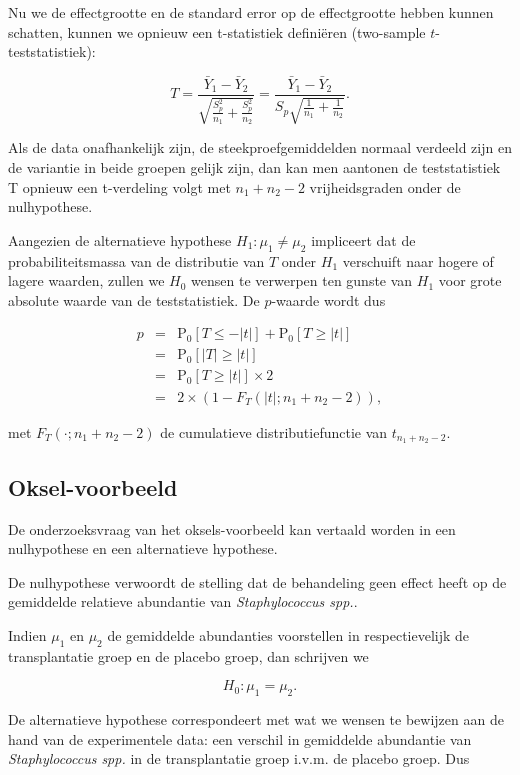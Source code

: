 \documentclass[
  12pt,dutch]{book}
\theoremstyle{definition}
\theoremstyle{definition}
\theoremstyle{definition}
\theoremstyle{definition}
\theoremstyle{remark}
\begin{document}
Nu we de effectgrootte en de standard error op de effectgrootte hebben kunnen schatten, kunnen we opnieuw een t-statistiek definiëren (two-sample \(t\)-teststatistiek):

\[T = \frac{\bar{Y}_1-\bar{Y}_2}{\sqrt{\frac{S_p^2}{n_1}+\frac{S_p^2}{n_2}}} =
  \frac{\bar{Y}_1 - \bar{Y}_2}{S_p\sqrt{\frac{1}{n_1}+\frac{1}{n_2}}}.\]

Als de data onafhankelijk zijn, de steekproefgemiddelden normaal verdeeld zijn en de variantie in beide groepen gelijk zijn, dan kan men aantonen de teststatistiek T opnieuw een t-verdeling volgt met \(n_1+n_2-2\) vrijheidsgraden onder de nulhypothese.

Aangezien de alternatieve hypothese \(H_1: \mu_1 \neq \mu_2\) impliceert dat de probabiliteitsmassa van de distributie van \(T\) onder \(H_1\) verschuift naar hogere of lagere waarden, zullen we \(H_0\) wensen te verwerpen ten gunste van \(H_1\) voor grote absolute waarde van de teststatistiek. De \(p\)-waarde wordt dus

\begin{eqnarray*}
  p&=&\text{P}_0\left[T\leq -|t|\right] + \text{P}_0\left[T\geq |t|\right]\\
  &=&\text{P}_0\left[\vert T\vert \geq \vert t \vert\right]\\
  &=&\text{P}_0\left[T \geq \vert t \vert\right]\times 2\\
  &=& 2\times(1-F_T(\vert t\vert;n_1+n_2-2)),
\end{eqnarray*}

met \(F_T(\cdot;n_1+n_2-2)\) de cumulatieve distributiefunctie van \(t_{n_1+n_2-2}\).

\subsection{Oksel-voorbeeld}\label{oksel-voorbeeld}

De onderzoeksvraag van het oksels-voorbeeld kan vertaald worden in een nulhypothese en een alternatieve hypothese.

De nulhypothese verwoordt de stelling dat de behandeling geen effect heeft op de gemiddelde relatieve abundantie van \emph{Staphylococcus spp.}.

Indien \(\mu_1\) en \(\mu_2\) de gemiddelde abundanties voorstellen in respectievelijk de transplantatie groep en de placebo groep, dan schrijven we

\[H_0: \mu_1=\mu_2.\]

De alternatieve hypothese correspondeert met wat we wensen te bewijzen aan de hand van de experimentele data: een verschil in gemiddelde abundantie van \emph{Staphylococcus spp.} in de transplantatie groep i.v.m. de placebo groep. Dus
\end{document}
